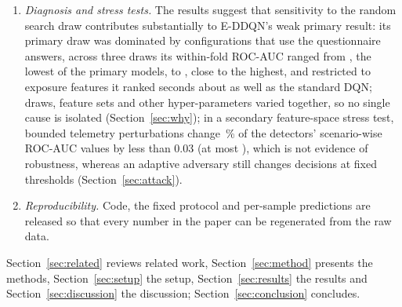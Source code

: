 \begin{enumerate}
\item \emph{Diagnosis and stress tests.} The results suggest that sensitivity to the random search draw contributes substantially to E-DDQN's weak primary result: its primary draw was dominated by configurations that use the questionnaire answers, across three draws its within-fold ROC-AUC ranged from \SDEDDQNWfMin, the lowest of the primary models, to \SDEDDQNWfMax, close to the highest, and restricted to exposure features it ranked seconds about as well as the standard DQN; draws, feature sets and other hyper-parameters varied together, so no single cause is isolated (Section~\ref{sec:why}); in a secondary feature-space stress test, bounded telemetry perturbations change \AttAucFracSmall\,\% of the detectors' scenario-wise ROC-AUC values by less than 0.03 (at most \AttAucMaxAbsChange), which is not evidence of robustness, whereas an adaptive adversary still changes decisions at fixed thresholds (Section~\ref{sec:attack}).
\item \emph{Reproducibility.} Code, the fixed protocol and per-sample predictions are released so that every number in the paper can be regenerated from the raw data.
\end{enumerate}

Section~\ref{sec:related} reviews related work, Section~\ref{sec:method} presents the methods, Section~\ref{sec:setup} the setup, Section~\ref{sec:results} the results and Section~\ref{sec:discussion} the discussion; Section~\ref{sec:conclusion} concludes.
